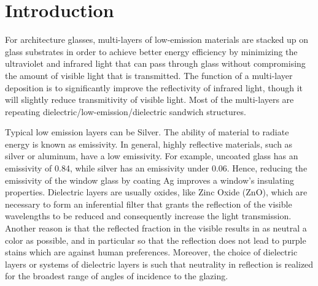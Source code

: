 \section{Introduction}

For architecture glasses, multi-layers of low-emission materials are stacked up on glass substrates in order to achieve better energy efficiency by minimizing the ultraviolet and infrared light that can pass through glass without compromising the amount of visible light that is transmitted. The function of a multi-layer deposition is to significantly improve the reflectivity of infrared light, though it will slightly reduce transmitivity of visible light. Most of the multi-layers are repeating dielectric/low-emission/dielectric sandwich structures.

Typical low emission layers can be Silver. The ability of material to radiate energy is known as emissivity. In general, highly reflective materials, such as silver or aluminum, have a low emissivity. For example, uncoated glass has an emissivity of 0.84, while silver has an emissivity under 0.06. Hence, reducing the emissivity of the window glass by coating Ag improves a window’s insulating properties. Dielectric layers are usually oxides, like Zinc Oxide (ZnO), which are necessary to form an inferential filter that grants the reflection of the visible wavelengths to be reduced and consequently increase the light transmission. Another reason is that the reflected fraction in the visible results in as neutral a color as possible, and in particular so that the reflection does not lead to purple stains which are against human preferences. Moreover, the choice of dielectric layers or systems of dielectric layers is such that neutrality in reflection is realized for the broadest range of angles of incidence to the glazing.

